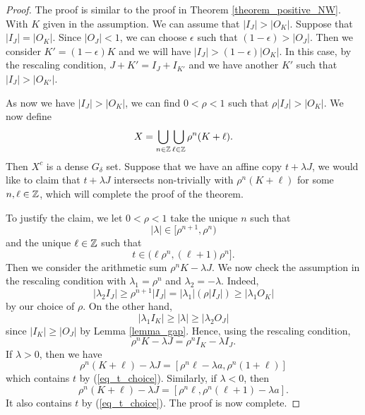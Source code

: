 \begin{proof}
The proof is similar to the proof in Theorem  \ref{theorem_positive_NW}. With $K$ given in the assumption. We can assume that $|I_J|>|O_K|$. Suppose that $|I_J| = |O_K|$. Since $|O_J|<1$, we can choose $\epsilon$ such that $(1-\epsilon) > |O_J|.$  Then we consider $K' = (1-\epsilon)K$ and we will have $|I_J|> (1-\epsilon)|O_K|$. In this case, by the rescaling condition,  $J+K' = I_J+I_{K'}$ and we have another $K'$ such that $|I_J|>|O_{K'}|$.  

\medskip

As now we have $|I_J|>|O_K|$, we can find $0<\rho<1$ such that $\rho |I_J| > |O_K|$. We now define  
$$
X = \bigcup_{n\in{\mathbb Z}}\bigcup_{\ell\in\mathbb{Z}} \rho^n (K+\ell). 
$$
Then $X^c$ is a  dense $G_{\delta}$ set. Suppose that we have an affine copy $t+\lambda J$, we would like to claim that $t+\lambda J$ intersects non-trivially   with $\rho^n (K+\ell)$ for some $n,\ell\in \mathbb{Z}$, which will complete the proof of the theorem. 

\medskip


To justify the claim, we let $0<\rho<1$ take the unique $n$ such that 
\begin{equation}\label{eq_lambda_choice}
    |\lambda| \in [\rho^{n+1}, \rho^{n})
\end{equation}
and the  unique $\ell\in\mathbb{Z}$ such that 
\begin{equation}\label{eq_t_choice}
t \in (\ell  \rho^n, (\ell+1)\rho^n].    
\end{equation}
Then we consider the arithmetic sum $\rho^n K-\lambda J$. We now check the assumption in  the rescaling condition with $\lambda_1=\rho^n$ and  $\lambda_2 = -\lambda$. Indeed,
$$
|\lambda_2 I_J| \ge \rho^{n+1}|I_J| = |\lambda_1| (\rho |I_J|) \ge  |\lambda_1 O_K| 
$$
by our choice of $\rho$. On the other hand, 
$$
|\lambda_1 I_K| \ge |\lambda|\ge |\lambda_2 O_J|
$$
since $|I_K|\ge |O_J|$ by Lemma \ref{lemma_gap}. Hence, using the rescaling condition, 
$$
\rho^n K -\lambda J= \rho^n I_K-\lambda I_J. 
$$
If $\lambda>0$, then we have 
$$
\rho^n (K+\ell) -\lambda J = [\rho^n\ell-\lambda a, \rho^n(1+\ell)]
$$
which contains $t$ by (\ref{eq_t_choice}). Similarly, if $\lambda<0$, then 
$$
\rho^n (K+\ell) -\lambda J = [\rho^n\ell,\rho^n(\ell+1)-\lambda a].
$$
It also contains $t$ by (\ref{eq_t_choice}). The proof is now complete. 
\end{proof}


